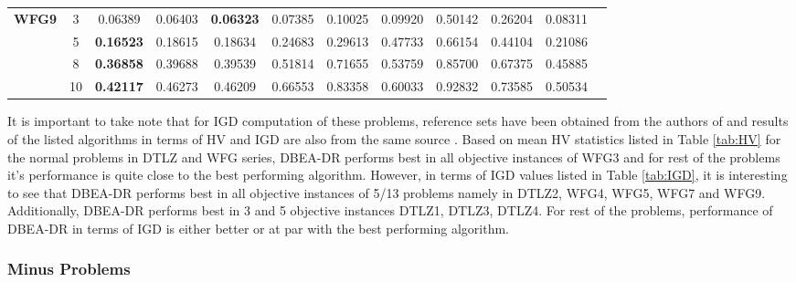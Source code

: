 \documentclass{sig-alternate}
\begin{document}
\begin{table*}[!htb]
\begin{tabular}{|c|c|c|c|c|c|c|c|c|c|c|c|}
		\multirow{4}{*}{\textbf{WFG9}}  & 3          & 0.06389          & 0.06403           & \textbf{0.06323}      & 0.07385          & 0.10025             & 0.09920             & 0.50142            & 0.26204              & 0.08311          \\ \cline{2-11} 
		& 5          & \textbf{0.16523} & 0.18615           & 0.18634               & 0.24683          & 0.29613             & 0.47733             & 0.66154            & 0.44104              & 0.21086          \\ \cline{2-11} 
		& 8          & \textbf{0.36858} & 0.39688           & 0.39539               & 0.51814          & 0.71655             & 0.53759             & 0.85700            & 0.67375              & 0.45885          \\ \cline{2-11} 
		& 10         & \textbf{0.42117} & 0.46273           & 0.46209               & 0.66553          & 0.83358             & 0.60033             & 0.92832            & 0.73585              & 0.50534          \\ \hline
	\end{tabular}
\end{table*}

It is important to take note that for IGD computation of these problems, reference sets have been obtained from the authors of \cite{ishibuchi2016inverse} and results of the listed algorithms in terms of HV and IGD are also from the same source \cite{ishibuchi2016inverse}. Based on mean HV statistics listed in Table \ref{tab:HV} for the normal problems in DTLZ and WFG series, DBEA-DR performs best in all objective instances of WFG3 and for rest of the problems it's performance is quite close to the best performing algorithm. However, in terms of IGD values listed in Table \ref{tab:IGD}, it is interesting to see that DBEA-DR performs best in all objective instances of 5/13 problems namely in DTLZ2, WFG4, WFG5, WFG7 and WFG9. Additionally, DBEA-DR performs best in 3 and 5 objective instances DTLZ1, DTLZ3, DTLZ4. For rest of the problems, performance of DBEA-DR in terms of IGD is either better or at par with the best performing algorithm. 

\subsubsection{Minus Problems}
\end{document}
